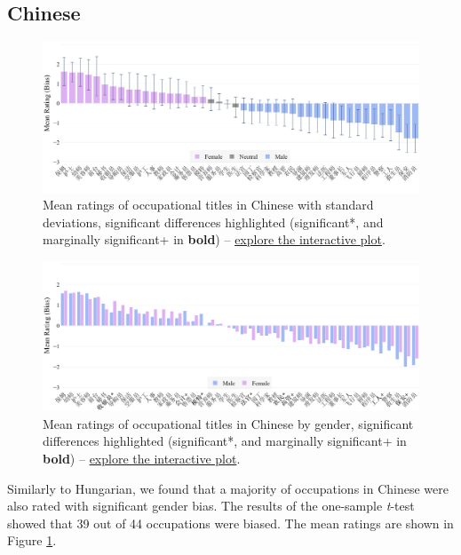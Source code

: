 \documentclass[11pt]{article}
\begin{document}
\subsection{Chinese}


\begin{figure}[!ht]
  \centering
  \includegraphics[width=\linewidth]{../occupations_zh}
  \caption{Mean ratings of occupational titles in Chinese with standard deviations, significant differences highlighted (significant*, and marginally significant+ in \textbf{bold}) -- \href{https://htmlpreview.github.io/?https://github.com/partigabor/occupational-bias/blob/main/occupations_zh.html}{explore the interactive plot}.}
  \label{fig:occupations_zh}
\end{figure}

\begin{figure}[]
  \centering
  \includegraphics[width=\linewidth]{../occupations_zh_gender}
  \caption{Mean ratings of occupational titles in Chinese by gender, significant differences highlighted (significant*, and marginally significant+ in \textbf{bold}) -- \href{https://htmlpreview.github.io/?https://github.com/partigabor/occupational-bias/blob/main/occupations_zh_gender.html}{explore the interactive plot}.}
  \label{fig:occupations_zh_gender}
\end{figure}

Similarly to Hungarian, we found that a majority of occupations in Chinese were also rated with significant gender bias. The results of the one-sample \textit{t}-test showed that 39 out of 44 occupations were biased. The mean ratings are shown in Figure \ref{fig:occupations_zh}.
\end{document}
